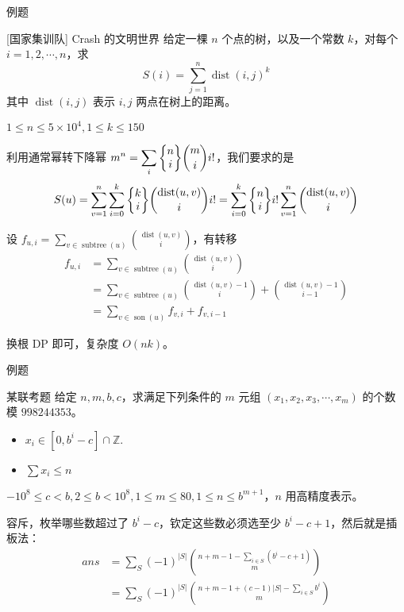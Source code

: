\documentclass[UTF8]{beamer}
\begin{document}
    \begin{frame}{例题}
        \begin{block}{[国家集训队] Crash 的文明世界}
            给定一棵 $n$ 个点的树，以及一个常数 $k$，对每个 $i=1,2,\cdots,n$，求
            $$
            S(i)=\sum_{j=1}^n\operatorname{dist}(i,j)^k
            $$
            其中 $\operatorname{dist}(i,j)$ 表示 $i,j$ 两点在树上的距离。

            $1\le n\le 5\times 10^4,1\le k\le 150$
        \end{block}

        \pause

        利用通常幂转下降幂 $\displaystyle m^n=\sum_{i} \St ni \binom mi i!$，我们要求的是
        $$
        S(u)=\sum_{v=1}^n\sum_{i=0}^k\St{k}i\binom{\operatorname{dist}(u,v)}{i} i!
        =\sum_{i=0}^k\St{n}i i!\sum_{v=1}^n\binom{\operatorname{dist}(u,v)}{i}
        $$
    \end{frame}

    \begin{frame}
        设 $\displaystyle f_{u,i} = \sum_{v\in \operatorname{subtree}(u)} \binom{\operatorname{dist}(u,v)}{i}$，有转移
        $$
        \begin{aligned}
        f_{u,i} &= \sum_{v\in \operatorname{subtree}(u)} \binom{\operatorname{dist}(u,v)}{i}\\
        &= \sum_{v\in \operatorname{subtree}(u)} \binom{\operatorname{dist}(u,v)-1}{i}+\binom{\operatorname{dist}(u,v)-1}{i-1}\\
        &= \sum_{v\in \operatorname{son}(u)}f_{v,i}+f_{v,i-1}
        \end{aligned}
        $$

        换根 DP 即可，复杂度 $O(nk)$。
    \end{frame}

    \begin{frame}{例题}
        \begin{block}{某联考题}
            给定 $n,m,b,c$，求满足下列条件的 $m$ 元组 $(x_1,x_2,x_3,\cdots,x_m)$ 的个数模 $998244353$。

            \begin{itemize}
                \item $x_i\in[0,b^i-c]\cap \mathbb Z$.
                \item  $\sum x_i\le n$
            \end{itemize}

            $-10^8\le c<b,2\le b<10^8,1\le m\le 80,1\le n\le b^{m+1}$，$n$ 用高精度表示。
        \end{block}

        \pause
        容斥，枚举哪些数超过了 $b^i-c$，钦定这些数必须选至少 $b^i-c+1$，然后就是插板法：
        $$
        \begin{aligned}
        ans&=\sum_{S}(-1)^{|S|}\binom{n+m-1-\sum_{i\in S}(b^i-c+1)}{m}\\
        &=\sum_{S}(-1)^{|S|}\binom{n+m-1+(c-1)|S|-\sum_{i\in S}b^i}{m}
        \end{aligned}
        $$
    \end{frame}
\end{document}
